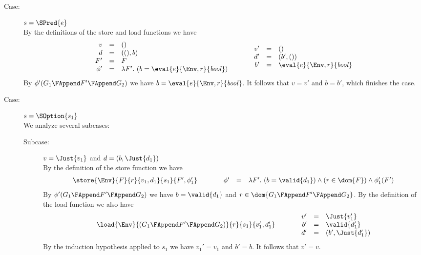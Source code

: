 {\begin{description}
\item[Case:] $s = \SPred{e}$\\[1ex]
%
By the definitions of the store and load functions we have
\[
\begin{array}{rcl}
v &=& ()\\
d &=& ((),b)\\
F' &=& F\\
\phi' &=& \lambda F'.~(b = \eval{e}{\Env,r}{\mathit{bool}})\\
\end{array}\hspace*{1cm}\begin{array}{rcl}
v' &=& ()\\
d' &=& (b',())\\
b' &=& \eval{e}{\Env,r}{\mathit{bool}}\\
\end{array}
\]
By $\phi'(G_1 \FAppend F' \FAppend G_2)$ we have $b =
\eval{e}{\Env,r}{\mathit{bool}}$. It follows that $v = v'$ and $b =
b'$, which finishes the case.

\item[Case:] $s = \SOption{s_1}$\\[1ex]
%
We analyze several subcases:
\begin{description}
\item[Subcase:] $v = \Just{v_1}$ and $d = (b,\Just{d_1})$\\[1ex]
%
By the definition of the store function we have
\[
\begin{array}{l}
\store{\Env}{F}{r}{ v_1,d_1 }{s_1}{F',\phi_1'}\\
\end{array}\hspace*{1cm}\begin{array}{rcl}
\phi' &=& \lambda F'.~(b = \valid{d_1}) \wedge (r \in \dom{F}) \wedge \phi_1'(F')\\
\end{array}
\]
%
By $\phi'(G_1 \FAppend F' \FAppend G_2)$ we have $b = \valid{d_1}$ and
$r \in \dom{G_1 \FAppend F' \FAppend G_2}$.  By the definition of the
load function we also have
\[ 
\begin{array}{rcll}
\load{\Env}{(G_1 \FAppend F' \FAppend G_2)}{r}{s_1}{v_1',d_1'}\\
\end{array}\hspace*{1cm}\begin{array}{rcl}
v' &=& \Just{v_1'}\\
b' &=& \valid{d_1'}\\
d' &=& (b',\Just{d_1'})\\
\end{array}
\]
By the induction hypothesis applied to $s_1$ we have $v_1' = v_1$ and
$b' = b$. It follows that $v' = v$.


\end{description}
\end{description}}
